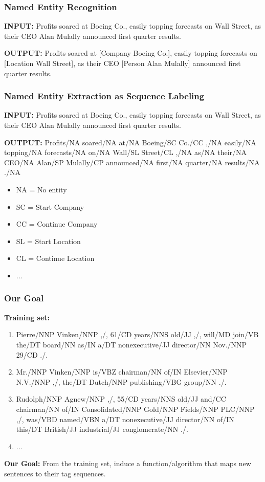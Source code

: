 \documentclass[handout]{beamer}
\begin{document}
\begin{frame}
  \frametitle{Named Entity Recognition}
  \textbf{INPUT:}
  Profits soared at Boeing Co., easily topping forecasts on Wall Street, as their CEO Alan Mulally announced first quarter results.

  \textbf{OUTPUT:}
  Profits soared at [Company Boeing Co.], easily topping forecasts on [Location Wall Street], as their CEO [Person Alan Mulally] announced first quarter results.
\end{frame}

\begin{frame}
  \frametitle{Named Entity Extraction as Sequence Labeling}
  \textbf{INPUT:}
  Profits soared at Boeing Co., easily topping forecasts on Wall Street, as their CEO Alan Mulally announced first quarter results.

  \textbf{OUTPUT:}
  Profits/NA soared/NA at/NA Boeing/SC Co./CC ,/NA easily/NA topping/NA forecasts/NA on/NA Wall/SL Street/CL ,/NA as/NA their/NA CEO/NA Alan/SP Mulally/CP announced/NA first/NA quarter/NA results/NA ./NA

  \begin{itemize}
    \item NA = No entity
    \item SC = Start Company
    \item CC = Continue Company
    \item SL = Start Location
    \item CL = Continue Location
    \item ...
  \end{itemize}
\end{frame}


\begin{frame}
  \frametitle{Our Goal}
  \textbf{Training set:}
  \begin{enumerate}
    \item Pierre/NNP Vinken/NNP ,/, 61/CD years/NNS old/JJ ,/, will/MD join/VB the/DT board/NN as/IN a/DT nonexecutive/JJ director/NN Nov./NNP 29/CD ./.
    \item Mr./NNP Vinken/NNP is/VBZ chairman/NN of/IN Elsevier/NNP N.V./NNP ,/, the/DT Dutch/NNP publishing/VBG group/NN ./.
    \item Rudolph/NNP Agnew/NNP ,/, 55/CD years/NNS old/JJ and/CC chairman/NN of/IN Consolidated/NNP Gold/NNP Fields/NNP PLC/NNP ,/, was/VBD named/VBN a/DT nonexecutive/JJ director/NN of/IN this/DT British/JJ industrial/JJ conglomerate/NN ./.
    \item ...
  \end{enumerate}

  \textbf{Our Goal:} From the training set, induce a function/algorithm that maps new sentences to their tag sequences.
\end{frame}
\end{document}
